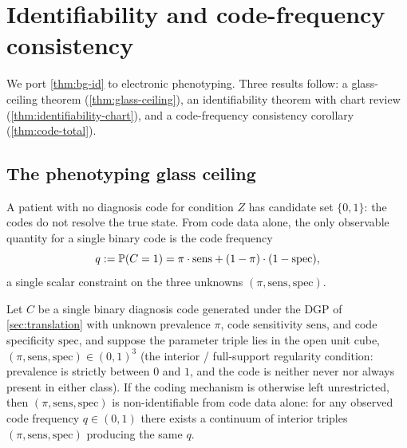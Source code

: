 \section{Identifiability and code-frequency consistency}
\label{sec:identifiability}

We port \cref{thm:bg-id} to electronic phenotyping. Three results
follow: a glass-ceiling theorem (\cref{thm:glass-ceiling}), an
identifiability theorem with chart review
(\cref{thm:identifiability-chart}), and a code-frequency consistency
corollary (\cref{thm:code-total}).

\subsection{The phenotyping glass ceiling}

A patient with no diagnosis code for condition $Z$ has candidate set
$\{0,1\}$: the codes do not resolve the true state. From code data
alone, the only observable quantity for a single binary code is the
code frequency
\begin{equation}
  q := \mathbb{P}(C = 1)
     = \pi \cdot \mathrm{sens} + (1 - \pi) \cdot (1 - \mathrm{spec}),
  \label{eq:code-freq}
\end{equation}
a single scalar constraint on the three unknowns $(\pi, \mathrm{sens},
\mathrm{spec})$.

\begin{theorem}
\label{thm:glass-ceiling}
Let $C$ be a single binary diagnosis code generated under the DGP of
\cref{sec:translation} with unknown prevalence $\pi$, code sensitivity
$\mathrm{sens}$, and code specificity $\mathrm{spec}$, and suppose the
parameter triple lies in the open unit cube, $(\pi, \mathrm{sens},
\mathrm{spec}) \in (0,1)^3$ (the interior / full-support regularity
condition: prevalence is strictly between $0$ and $1$, and the code is
neither never nor always present in either class). If the coding
mechanism is otherwise left unrestricted, then $(\pi, \mathrm{sens},
\mathrm{spec})$ is non-identifiable from code data alone: for any
observed code frequency $q \in (0,1)$ there exists a continuum of
interior triples $(\pi, \mathrm{sens}, \mathrm{spec})$ producing the
same $q$.
\end{theorem}

